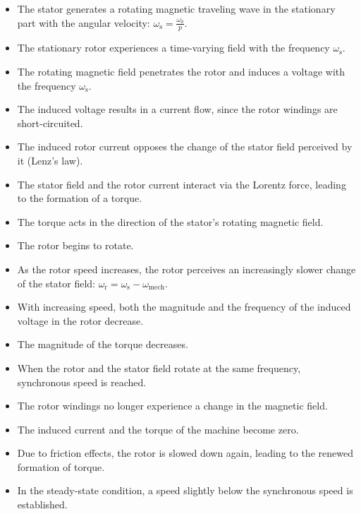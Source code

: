 \begin{frame}	
	\begin{itemize}
		\item The stator generates a rotating magnetic traveling wave in the stationary part with the angular velocity:
		$\omega_\mathrm{s} = \frac{\omega_0}{p}$.\pause
		\item The stationary rotor experiences a time-varying field with the frequency $\omega_\mathrm{s}$.\pause
		\item The rotating magnetic field penetrates the rotor and induces a voltage with the frequency $\omega_\mathrm{s}$.\pause
		\item The induced voltage results in a current flow, since the rotor windings are short-circuited.\pause
		\item The induced rotor current opposes the change of the stator field perceived by it (Lenz’s law).\pause
		\item The stator field and the rotor current interact via the Lorentz force, leading to the formation of a torque.\pause
		\item The torque acts in the direction of the stator’s rotating magnetic field.\pause
		\item The rotor begins to rotate.

	\end{itemize}
\end{frame}

\begin{frame}	    
	\begin{itemize}
		\item As the rotor speed increases, the rotor perceives an increasingly slower change of the stator field:
		$\omega_\mathrm{r} = \omega_\mathrm{s} - \omega_\mathrm{mech}$.\pause
		\item With increasing speed, both the magnitude and the frequency of the induced voltage in the rotor decrease.\pause
		\item The magnitude of the torque decreases.\pause
		\item When the rotor and the stator field rotate at the same frequency, synchronous speed is reached.\pause
		\item The rotor windings no longer experience a change in the magnetic field.\pause
		\item The induced current and the torque of the machine become zero.\pause
		\item Due to friction effects, the rotor is slowed down again, leading to the renewed formation of torque.\pause
		\item In the steady-state condition, a speed slightly below the synchronous speed is established.

	\end{itemize}
\end{frame}



